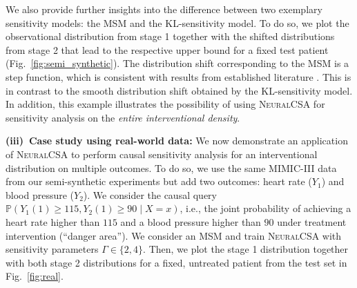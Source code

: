 \documentclass{article} %
\newcommand{\frameworkname}{\textsc{NeuralCSA}\xspace}
\theoremstyle{definition}
\theoremstyle{plain}
\begin{document}
\begin{table}
\vspace{-0.4cm}
\caption{Results for semi-synthetic data}
\vspace{-0.4cm}
\label{tab:semi_synthetic}
\vspace{-0.3cm}
\end{table}
We also provide further insights into the difference between two exemplary sensitivity models: the MSM and the KL-sensitivity model. To do so, we plot the observational distribution from stage 1 together with the shifted distributions from stage 2 that lead to the respective upper bound for a fixed test patient (Fig.~\ref{fig:semi_synthetic}). The distribution shift corresponding to the MSM is a step function, which is consistent with results from established literature \citep{Jin.2023}. This is in contrast to the smooth distribution shift obtained by the KL-sensitivity model. In addition, this example illustrates the possibility of using \frameworkname for sensitivity analysis on the \emph{entire interventional density}.

\textbf{(iii)~Case study using real-world data:} We now demonstrate an application of \frameworkname to perform causal sensitivity analysis for an interventional distribution on multiple outcomes. To do so, we use the same MIMIC-III data from our semi-synthetic experiments but add two outcomes: heart rate ($Y_1$) and blood pressure ($Y_2$). We consider the causal query $\mathbb{P}(Y_1(1) \geq 115, Y_2(1) \geq 90 \mid X = x)$, i.e., the joint probability of achieving a heart rate higher than $115$ and a blood pressure higher than $90$ under treatment intervention (``danger area''). We consider an MSM and train \frameworkname with sensitivity parameters $\Gamma \in \{2, 4\}$. Then, we plot the stage 1 distribution together with both stage 2 distributions for a fixed, untreated patient from the test set in Fig.~\ref{fig:real}.
\end{document}
